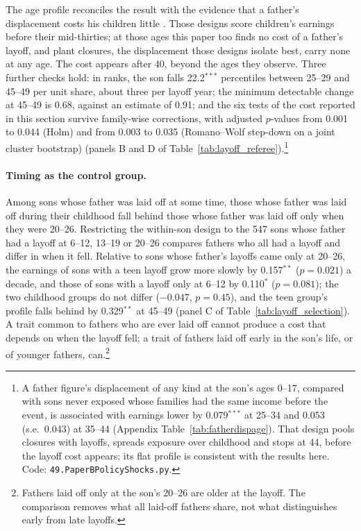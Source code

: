 The age profile reconciles the result with the evidence that a father's displacement costs his children little
\citep{oreopoulos2008intergenerational, hilger2016parental}. Those designs score children's earnings before their
mid-thirties; at those ages this paper too finds no cost of a father's layoff, and plant closures, the displacement
those designs isolate best, carry none at any age. The cost appears after 40, beyond the ages they observe. Three further
checks hold: in ranks, the son falls 22.2$^{***}$ percentiles between 25--29 and 45--49 per unit share, about three per
layoff year; the minimum detectable change at 45--49 is 0.68, against an estimate of 0.91; and the six tests of the cost
reported in this section survive family-wise corrections, with adjusted $p$-values from 0.001 to 0.044 (Holm) and from
0.003 to 0.035 (Romano--Wolf step-down on a joint cluster bootstrap) (panels B and
D of Table~\ref{tab:layoff_referee}).\footnote{A father figure's displacement of any kind at the son's ages 0--17, compared with sons never
exposed whose families had the same income before the event, is associated with earnings lower by 0.079$^{***}$ at
25--34 and 0.053 (s.e.\ 0.043) at 35--44 (Appendix Table~\ref{tab:fatherdispage}). That design pools closures with layoffs,
spreads exposure over childhood and stops at 44, before the layoff cost appears; its flat profile is consistent with the
results here. Code: \texttt{49.PaperBPolicyShocks.py}.}

\paragraph{Timing as the control group.} Among sons whose father was laid off at some time, those whose father was laid
off during their childhood fall behind those whose father was laid off only when they were 20--26. Restricting the
within-son design to the 547 sons whose father had a layoff at 6--12, 13--19 or 20--26 compares fathers who all had a
layoff and differ in when it fell. Relative to sons whose father's layoffs came only at 20--26, the earnings of sons
with a teen layoff grow more slowly by 0.157$^{**}$ ($p = 0.021$) a decade, and those of sons with a layoff only at
6--12 by 0.110$^{*}$ ($p = 0.081$); the two childhood groups do not differ ($-0.047$, $p = 0.45$), and the teen group's
profile falls behind by 0.329$^{**}$ at 45--49 (panel C of Table~\ref{tab:layoff_selection}). A trait common to fathers
who are ever laid off cannot produce a cost that depends on when the layoff fell; a trait of fathers laid off early in
the son's life, or of younger fathers, can.\footnote{Fathers laid off only at the son's 20--26 are older at the layoff.
The comparison removes what all laid-off fathers share, not what distinguishes early from late layoffs.}


